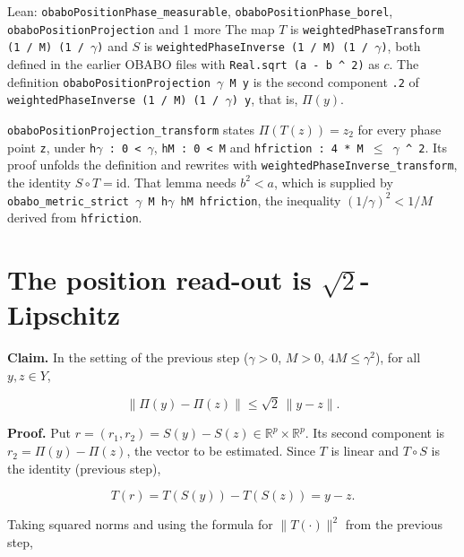 \documentclass[11pt,a4paper]{article}
\begin{document}
\begin{leanbox}{Lean: \texttt{obaboPositionPhase\_\allowbreak{}measurable}, \texttt{obaboPositionPhase\_\allowbreak{}borel}, \texttt{obaboPositionProjection} and 1 more}
The map \(T\) is \texttt{weighted\allowbreak{}Phase\allowbreak{}Transform (1 /\allowbreak{} M) (1 /\allowbreak{} \ensuremath{\gamma})} and \(S\) is \texttt{weighted\allowbreak{}Phase\allowbreak{}Inverse (1 /\allowbreak{} M) (1 /\allowbreak{} \ensuremath{\gamma})}, both defined in the earlier OBABO files with \texttt{Real.\allowbreak{}sqrt (a -\allowbreak{} b \textasciicircum{} 2)} as \(c\). The definition \texttt{obabo\allowbreak{}Position\allowbreak{}Projection \ensuremath{\gamma} M y} is the second component \texttt{.\allowbreak{}2} of \texttt{weighted\allowbreak{}Phase\allowbreak{}Inverse (1 /\allowbreak{} M) (1 /\allowbreak{} \ensuremath{\gamma}) y}, that is, \(\Pi(y)\).




\texttt{obabo\allowbreak{}Position\allowbreak{}Projection\_\allowbreak{}transform} states \(\Pi(T(z))=z_2\) for every phase point \texttt{z}, under \texttt{h\ensuremath{\gamma} : 0 < \ensuremath{\gamma}}, \texttt{h\allowbreak{}M : 0 < M} and \texttt{hfriction : 4 * M \ensuremath{\le} \ensuremath{\gamma} \textasciicircum{} 2}. Its proof unfolds the definition and rewrites with \texttt{weighted\allowbreak{}Phase\allowbreak{}Inverse\_\allowbreak{}transform}, the identity \(S\circ T=\mathrm{id}\). That lemma needs \(b^2<a\), which is supplied by \texttt{obabo\_\allowbreak{}metric\_\allowbreak{}strict \ensuremath{\gamma} M h\ensuremath{\gamma} h\allowbreak{}M hfriction}, the inequality \((1/\gamma)^2<1/M\) derived from \texttt{hfriction}.
\end{leanbox}

\section{\texorpdfstring{The position read-out is \(\sqrt2\)-Lipschitz}{The position read-out is sqrt2-Lipschitz}}


\textbf{Claim.} In the setting of the previous step (\(\gamma>0\), \(M>0\), \(4M\le\gamma^2\)), for all \(y,z\in Y\),


\[\|\Pi(y)-\Pi(z)\|\le\sqrt2\,\|y-z\|.\]


\textbf{Proof.} Put \(r=(r_1,r_2)=S(y)-S(z)\in\mathbb R^p\times\mathbb R^p\). Its second component is \(r_2=\Pi(y)-\Pi(z)\), the vector to be estimated. Since \(T\) is linear and \(T\circ S\) is the identity (previous step),


\[T(r)=T(S(y))-T(S(z))=y-z.\]


Taking squared norms and using the formula for \(\|T(\cdot)\|^2\) from the previous step,
\end{document}
